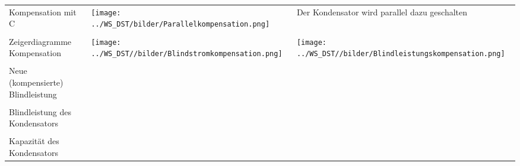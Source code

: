 
\begin{tabular}{p{7cm}p{4.5cm}p{5cm}}
	Kompensation mit C &
    	\begin{minipage}{4cm}
        	\texttt{[image: ../WS\_DST/bilder/Parallelkompensation.png]}
        \end{minipage} & 
		Der Kondensator wird parallel dazu geschalten \\ \\
	Zeigerdiagramme Kompensation &
		\begin{minipage}{4.5cm}
        	\texttt{[image: ../WS\_DST//bilder/Blindstromkompensation.png]}
        \end{minipage} &
		\begin{minipage}{4.5cm}
        	\texttt{[image: ../WS\_DST//bilder/Blindleistungskompensation.png]}
        \end{minipage} \\ \\
	Neue (kompensierte) Blindleistung &
		\fbox{$Q_{Lk} = P \cdot \tan{\varphi_k}$} \\ \\
	Blindleistung des Kondensators &
		\fbox{$Q_C = Q_{Lk} - Q_L$} \\ \\
	Kapazit\"at des Kondensators &
		\fbox{$C = -\frac{Q_C}{\omega U^2}$} \\
\end{tabular}